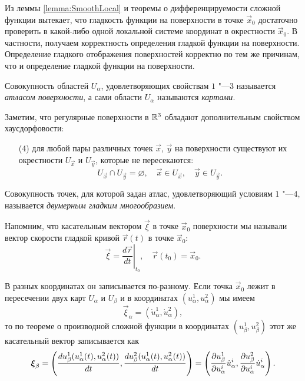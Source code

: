 Из леммы \ref{lemma:SmoothLocal} и теоремы о дифференцируемости сложной функции вытекает, что гладкость функции на поверхности в точке $\vec{x}_0$ достаточно проверить в какой-либо одной локальной системе координат в окрестности $\vec{x}_0$. В частности, получаем корректность определения гладкой функции на поверхности. Определение гладкого отображения поверхностей корректно по тем же причинам, что и определение гладкой функции на поверхности.

\begin{definition}
	Совокупность областей $U_\alpha$, удовлетворяющих свойствам $1$ "---$3$ называется \textit{атласом поверхности}, а сами области $U_\alpha$ называются \textit{картами}.
\end{definition}

Заметим, что регулярные поверхности в $\mathbb{R}^3$ обладают дополнительным свойством хаусдорфовости:
\begin{enumerate}[nolistsep, label=(\arabic*)]
	\item[(4)] для любой пары различных точек $\vec{x}$, $\vec{y}$ на поверхности существуют их окрестности $U_{\vec{x}}$ и $U_{\vec{y}}$, которые не пересекаются:
		\[
			U_{\vec{x}} \cap U_{\vec{y}} = \varnothing,\quad \vec{x} \in U_{\vec{x}},\quad \vec{y} \in U_{\vec{y}}.
		\]
\end{enumerate}

\begin{definition}
	Совокупность точек, для которой задан атлас, удовлетворяющий условиям $1$ "---$4$, называется \textit{двумерным гладким многообразием}.
\end{definition}

Напомним, что касательным вектором $\vec{\xi}$ в точке $\vec{x}_0$ поверхности мы называли вектор скорости гладкой кривой $\vec{r}(t)$ в точке $\vec{x}_0$:
\[
	\vec{\xi} = \left.\frac{d\vec{r}}{dt}\right|_{t_0},\quad \vec{r}(t_0) = \vec{x}_0.
\]

В разных координатах он записывается по-разному. Если точка $\vec{x}_0$ лежит в пересечении двух карт $U_\alpha$ и $U_\beta$ и в координатах $(u_\alpha^1, u_\alpha^2)$ мы имеем
\[
	\vec{\xi}_\alpha = (\dot{u}^1_\alpha, \dot{u}^2_\alpha),
\]
то по теореме о производной сложной функции в координатах $(u_\beta^1, u_\beta^2)$ этот же касательный вектор записывается как
\[
	\boldsymbol{\xi}_\beta = \left(\frac{du_\beta^1(u_\alpha^1(t), u_\alpha^2(t))}{dt}, \frac{du_\beta^2(u_\alpha^1(t), u_\alpha^2(t))}{dt}\right) = \left(\frac{\partial u_\beta^1}{\partial u^i_\alpha}\dot{u}_\alpha^i, \frac{\partial u_\beta^2}{\partial u^i_\alpha}\dot{u}_\alpha^i\right).
\]

